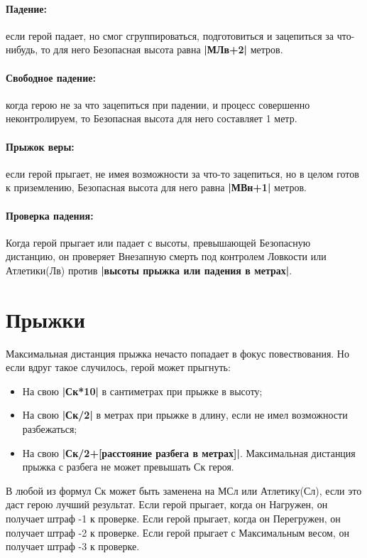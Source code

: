 \paragraph{Падение:} если герой падает, но смог сгруппироваться, подготовиться и зацепиться за что-нибудь, то для него Безопасная высота равна \textbf{|МЛв+2|} метров.
\paragraph{Свободное падение:} когда герою не за что зацепиться при падении, и процесс совершенно неконтролируем, то Безопасная высота для него составляет 1 метр.
\paragraph{Прыжок веры:} если герой прыгает, не имея возможности за что-то зацепиться, но в целом готов к приземлению, Безопасная высота для него равна \textbf{|МВн+1|} метров.
\paragraph{Проверка падения:} Когда герой прыгает или падает с высоты, превышающей Безопасную дистанцию, он проверяет Внезапную смерть под контролем Ловкости или Атлетики(Лв) против \textbf{|высоты прыжка или падения в метрах|}.

\section{Прыжки}
Максимальная дистанция прыжка нечасто попадает в фокус повествования. Но если вдруг такое случилось, герой может прыгнуть:
\begin{itemize}
  \item На свою \textbf{|Ск*10|} в сантиметрах при прыжке в высоту;
  \item На свою \textbf{|Ск/2|} в метрах при прыжке в длину, если не имел возможности разбежаться;
  \item На свою \textbf{|Ск/2+[расстояние разбега в метрах]|}. Максимальная дистанция прыжка с разбега не может превышать Ск героя.
\end{itemize}
В любой из формул Ск может быть заменена на МСл или Атлетику(Сл), если это даст герою лучший результат.
\newline Если герой прыгает, когда он Нагружен, он получает штраф -1 к проверке.
\newline Если герой прыгает, когда он Перегружен, он получает штраф -2 к проверке.
\newline Если герой прыгает с Максимальным весом, он получает штраф -3 к проверке.

